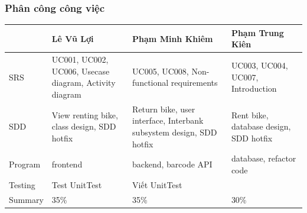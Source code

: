 \documentclass[11pt]{beamer}
\renewcommand{\raggedright}{\leftskip=0pt \rightskip=0pt plus 0cm}
\let\olditemize=\itemize
\renewenvironment{itemize}{\olditemize\raggedright}{\endlist}
\begin{document}
\begin{frame}[plain]
	\maketitle
\end{frame}
\begin{frame}[plain]
	\frametitle{Phân công công việc}
\renewcommand{\arraystretch}{1.5}
\begin{scriptsize}
	\begin{tabular}{|p{.1\linewidth}|p{.25\linewidth}|p{.25\linewidth}|p{.25\linewidth}|}
		\hline
		& Lê Vũ Lợi & Phạm Minh Khiêm & Phạm Trung Kiên \\\hline
		SRS & UC001, UC002, UC006, Usecase diagram, Activity diagram & UC005, UC008, Non-functional requirements & UC003, UC004, UC007, Introduction\\\hline
		SDD & View renting bike, class design, SDD hotfix & Return bike, user interface, Interbank subsystem design, SDD hotfix & Rent bike, database design, SDD hotfix \\\hline
		Program & frontend & backend, barcode API & database, refactor code \\\hline
		Testing & Test UnitTest & Viết UnitTest & \\\hline
		Summary & 35\% & 35\% & 30\% \\\hline
	\end{tabular}
\end{scriptsize}
\end{frame}
\end{document}
